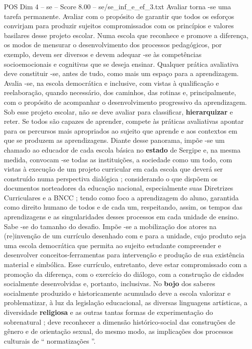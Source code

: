 \begin{textsample}{POS Dim 4 – se – Score 8.00 – se/se\_inf\_e\_ef\_3.txt}
Avaliar torna -se uma tarefa permanente.
Avaliar com o propósito de garantir que todos os esforços convirjam para produzir sujeitos compromissados com os princípios e valores basilares desse projeto escolar.
Numa escola que reconhece e promove a diferença, os modos de mensurar o desenvolvimento dos processos pedagógicos, por exemplo, devem ser diversos e devem adequar -se às competências socioemocionais e cognitivas que se deseja ensinar.
Qualquer prática avaliativa deve constituir -se, antes de tudo, como mais um espaço para a aprendizagem.
Avalia -se, na escola democrática e inclusive, com vistas à qualificação e reelaboração, quando necessário, dos caminhos, das rotinas e, principalmente, com o propósito de acompanhar o desenvolvimento progressivo da aprendizagem.
Sob esse projeto escolar, não se deve avaliar para classificar, \textbf{hierarquizar} e reter.
Se todos são capazes de aprender, compete às práticas avaliativas apontar para os percursos mais apropriados ao sujeito que aprende e aos contextos em que se produzem as aprendizagens.
Diante desse panorama, impõe -se um chamado ao educador de cada escola básica no \textbf{estado} de Sergipe e, na mesma medida, convocam -se todas as instituições, a sociedade como um todo, com vistas à execução de um projeto curricular em cada escola que deverá ser construído numa perspectiva dialógica ; considerando o que dispõem os documentos norteadores da educação nacional, especialmente suas Diretrizes Curriculares e a BNCC ; tendo como foco a aprendizagem do aluno, garantida como direito humano de todos e de cada um, respeitando, assim, os tempos das aprendizagens e as singularidades desses processos em cada unidade de ensino.
Sabe -se do tamanho do desafio.
Impõe -se a mobilização dos atores na (re)invenção de um currículo desenhado com e para a unidade, cujo produto seja uma escola democrática que permita ao sujeito estudante compreender e desenvolver conceitos-ferramentas para intervenção e produção de sua existência material e simbólica.
Esse currículo, entretanto, deve estar compromissado com a promoção da diferença, com o exercício do diálogo, com a construção de cidades socialmente desenvolvidas e, portanto, inclusivas.
No \textbf{bojo} dos saberes socialmente produzido e historicamente acumulado deve a escola valorizar e problematizar, à luz da legislação educacional, as diversas linguagens artísticas, a diversidade \textbf{religiosa} e as outras tantas formas de experimentação do sobrenatural ; deve reconhecer a dimensão histórico-social das construções de gênero e de orientação sexual, do mesmo modo, as implicações dos processos culturais de “ normatizações ”.

\end{textsample}
